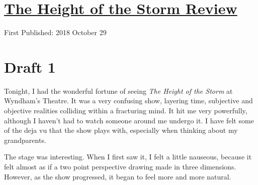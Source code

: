 \documentclass[12pt]{article}[titlepage]
\newcommand{\1}{\={a}}
\newcommand{\2}{\={e}}
\newcommand{\3}{\={\i}}
\newcommand{\4}{\=o}
\newcommand{\5}{\=u}
\newcommand{\6}{\={A}}
\renewcommand{\,}{\textsuperscript{,}}
\begin{document}
\doublespacing
\section{\href{height-of-the-storm.html}{The Height of the Storm Review}}
First Published: 2018 October 29
\section{Draft 1}
Tonight, I had the wonderful fortune of seeing \textit{The Height of the Storm}  at Wyndham's Theatre.
It was a very confusing show, layering time, subjective and objective realities colliding within a fracturing mind.
It hit me very powerfully, although I haven't had to watch someone around me undergo it.
I have felt some of the deja vu that the show plays with, especially when thinking about my grandparents.

The stage was interesting.
When I first saw it, I felt a little nauseous, because it felt almost as if a two point perspective drawing made in three dimensions.
However, as the show progressed, it began to feel more and more natural.
\end{document}
